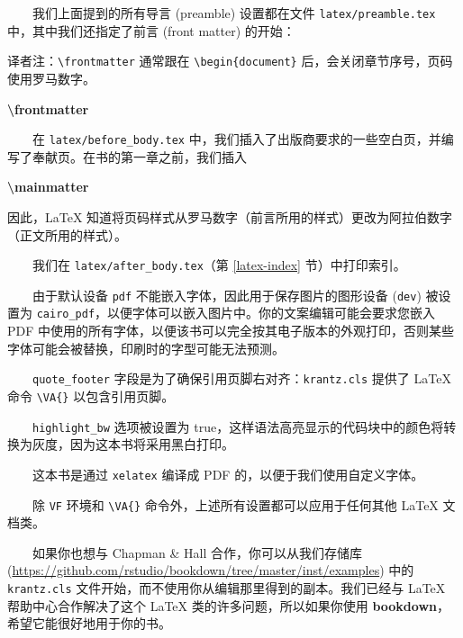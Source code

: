 \documentclass[
  12pt,
]{krantz}
\newenvironment{Shaded}{\begin{snugshade}}{\end{snugshade}}
\newcommand{\FunctionTok}[1]{\textcolor[rgb]{0.13,0.29,0.53}{\textbf{#1}}}
\renewenvironment{quote}{\begin{VF}}{\end{VF}}
\theoremstyle{definition}
\theoremstyle{definition}
\theoremstyle{definition}
\theoremstyle{definition}
\theoremstyle{remark}
\begin{document}
  我们上面提到的所有导言 (preamble) 设置都在文件 \texttt{latex/preamble.tex} 中，其中我们还指定了前言 (front matter) 的开始：

\begin{quote}
译者注：\texttt{\textbackslash{}frontmatter} 通常跟在 \texttt{\textbackslash{}begin\{document\}} 后，会关闭章节序号，页码使用罗马数字。
\end{quote}

\begin{Shaded}
\begin{Highlighting}[]
\FunctionTok{\textbackslash{}frontmatter}
\end{Highlighting}
\end{Shaded}

  在 \texttt{latex/before\_body.tex} 中，我们插入了出版商要求的一些空白页，并编写了奉献页。在书的第一章之前，我们插入

\begin{Shaded}
\begin{Highlighting}[]
\FunctionTok{\textbackslash{}mainmatter}
\end{Highlighting}
\end{Shaded}

因此，LaTeX 知道将页码样式从罗马数字（前言所用的样式）更改为阿拉伯数字（正文所用的样式）。

  我们在 \texttt{latex/after\_body.tex}（第 \ref{latex-index} 节）中打印索引。

  由于默认设备 \texttt{pdf} 不能嵌入字体，因此用于保存图片的图形设备 (\texttt{dev}) 被设置为 \texttt{cairo\_pdf}，以便字体可以嵌入图片中。你的文案编辑可能会要求您嵌入 PDF 中使用的所有字体，以便该书可以完全按其电子版本的外观打印，否则某些字体可能会被替换，印刷时的字型可能无法预测。

  \texttt{quote\_footer} 字段是为了确保引用页脚右对齐：\texttt{krantz.cls} 提供了 LaTeX 命令 \texttt{\textbackslash{}VA\{\}} 以包含引用页脚。

  \texttt{highlight\_bw} 选项被设置为 true，这样语法高亮显示的代码块中的颜色将转换为灰度，因为这本书将采用黑白打印。

  这本书是通过 \texttt{xelatex} 编译成 PDF 的，以便于我们使用自定义字体。

  除 \texttt{VF} 环境和 \texttt{\textbackslash{}VA\{\}} 命令外，上述所有设置都可以应用于任何其他 LaTeX 文档类。

  如果你也想与 Chapman \& Hall 合作，你可以从我们存储库 (\url{https://github.com/rstudio/bookdown/tree/master/inst/examples}) 中的 \texttt{krantz.cls} 文件开始，而不使用你从编辑那里得到的副本。我们已经与 LaTeX 帮助中心合作解决了这个 LaTeX 类的许多问题，所以如果你使用 \textbf{bookdown}，希望它能很好地用于你的书。
\end{document}
